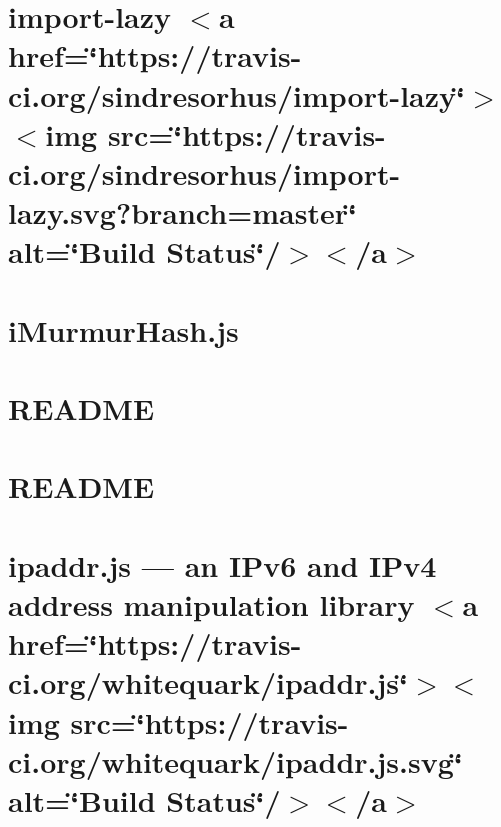\let\mypdfximage\pdfximage\def\pdfximage{\immediate\mypdfximage}\documentclass[twoside]{book}
\newcommand{\+}{\discretionary{\mbox{\scriptsize$\hookleftarrow$}}{}{}}
\begin{document}
\chapter{import-\/lazy $<$a href=\char`\"{}https\+://travis-\/ci.\+org/sindresorhus/import-\/lazy\char`\"{}$>$$<$img src=\char`\"{}https\+://travis-\/ci.\+org/sindresorhus/import-\/lazy.\+svg?branch=master\char`\"{} alt=\char`\"{}\+Build Status\char`\"{}/$>$$<$/a$>$}
\label{md__c_1__git_hub__p_r_o_y_e_c_t_o-_i_i_i-_g_o_t_rest-api-node-mysql_node_modules_import-lazy_readme}

\chapter{i\+Murmur\+Hash.\+js}
\label{md__c_1__git_hub__p_r_o_y_e_c_t_o-_i_i_i-_g_o_t_rest-api-node-mysql_node_modules_imurmurhash__r_e_a_d_m_e}

\chapter{R\+E\+A\+D\+ME}
\label{md__c_1__git_hub__p_r_o_y_e_c_t_o-_i_i_i-_g_o_t_rest-api-node-mysql_node_modules_inherits__r_e_a_d_m_e}

\chapter{R\+E\+A\+D\+ME}
\label{md__c_1__git_hub__p_r_o_y_e_c_t_o-_i_i_i-_g_o_t_rest-api-node-mysql_node_modules_ini__r_e_a_d_m_e}

\chapter{ipaddr.\+js — an I\+Pv6 and I\+Pv4 address manipulation library $<$a href=\char`\"{}https\+://travis-\/ci.\+org/whitequark/ipaddr.\+js\char`\"{}$>$$<$img src=\char`\"{}https\+://travis-\/ci.\+org/whitequark/ipaddr.\+js.\+svg\char`\"{} alt=\char`\"{}\+Build Status\char`\"{}/$>$$<$/a$>$}
\label{md__c_1__git_hub__p_r_o_y_e_c_t_o-_i_i_i-_g_o_t_rest-api-node-mysql_node_modules_ipaddr_8js__r_e_a_d_m_e}

\end{document}
